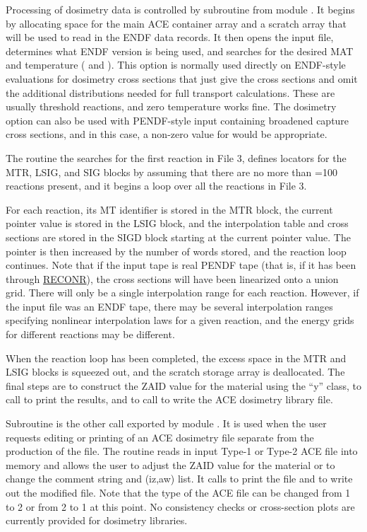 Processing of dosimetry data is controlled by
subroutine 
from module .  It
begins by allocating space for the main ACE container array
 and a scratch array  that
will be used to read in the ENDF data records.  It then opens
the input file, determines what ENDF version is being used, and
searches for the desired MAT and temperature ( and
).  This option is normally used directly on ENDF-style
evaluations for dosimetry cross sections that just give the cross
sections and omit the additional distributions needed for full
transport calculations.  These are usually threshold reactions, and
zero temperature works fine.  The dosimetry option can also be used
with PENDF-style input containing broadened capture cross sections,
and in this case, a non-zero value for  would be
appropriate.

The  routine the searches for the first reaction in
File 3, defines locators for the MTR, LSIG, and SIG blocks by
assuming that there are no more than =100 reactions present,
and it begins a loop over all the reactions in File 3.

For each reaction, its MT identifier is stored in the MTR block, the
current pointer value is stored in the LSIG block, and the
interpolation table and cross sections are stored in the SIGD block
starting at the current pointer value.  The pointer is then increased
by the number of words stored, and the reaction loop continues.  Note
that if the input tape is real PENDF tape (that is, if it has been
through \hyperlink{sRECONRhy}{RECONR}), the cross
sections will have been linearized onto
a union grid.  There will only be a single interpolation range for
each reaction.  However, if the input file was an ENDF tape, there
may be several interpolation ranges specifying nonlinear interpolation
laws for a given reaction, and the energy grids for different reactions
may be different.

When the reaction loop has been completed, the excess space in the
MTR and LSIG blocks is squeezed out, and the scratch storage array is
deallocated.  The final steps are to construct the ZAID value for
the material using the ``y'' class, to call
 to print
the results, and to call
 to write the ACE dosimetry
library file.

Subroutine 
is the other call exported by module .  It is used
when the user requests editing or printing of an ACE dosimetry
file separate from the production of the file.  The routine
reads in input Type-1 or Type-2 ACE file into
memory and allows the user to adjust the ZAID value for the
material or to change the comment string and (iz,aw) list.  It calls
 to print the file and  to write out the
modified file.  Note that the type of the ACE file can be changed
from 1 to 2 or from 2 to 1 at this point.  No consistency checks or
cross-section plots are currently provided for dosimetry libraries.


